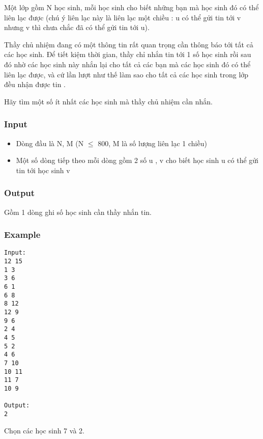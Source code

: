 

Một lớp gồm N học sinh, mỗi học sinh cho biết những bạn mà học sinh đó có thể liên lạc được (chú ý liên lạc này là liên lạc một chiều : u có thể gửi tin tới v nhưng v thì chưa chắc đã có thể gửi tin tới u).

Thầy chủ nhiệm đang có một thông tin rất quan trọng cần thông báo tới tất cả các học sinh. Để tiết kiệm thời gian, thầy chỉ nhắn tin tới 1 số học sinh rồi sau đó nhờ các học sinh này nhắn lại cho tất cả các bạn mà các học sinh đó có thể liên lạc được, và cứ lần lượt như thế làm sao cho tất cả các học sinh trong lớp đều nhận được tin .

Hãy tìm một số ít nhất các học sinh mà thầy chủ nhiệm cần nhắn.

\subsubsection{Input}
\begin{itemize}
	\item Dòng đầu là N, M (N  $\le$  800, M là số lượng liên lạc 1 chiều)
	\item Một số dòng tiếp theo mỗi dòng gồm 2 số u , v cho biết học sinh u có thể gửi tin tới học sinh v
\end{itemize}

\subsubsection{Output}

Gồm 1 dòng ghi số học sinh cần thầy nhắn tin.

\subsubsection{Example}
\begin{verbatim}
Input:
12 15
1 3
3 6
6 1
6 8
8 12
12 9
9 6
2 4
4 5
5 2
4 6
7 10
10 11
11 7
10 9

Output:
2
\end{verbatim}

Chọn các học sinh 7 và 2.
